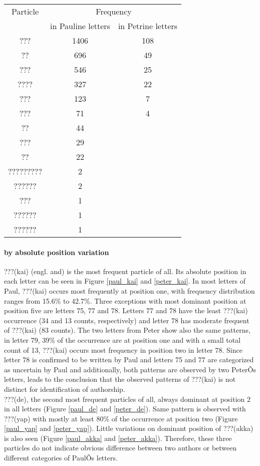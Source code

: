 \documentclass[a4paper]{article}
\begin{document}
{\renewcommand{\arraystretch}{1.3}
\begin{tabular}{ccc}
\hline
Particle &	\multicolumn{2}{c}{Frequency} \\
\cline{2-3}
&in Pauline letters  & in Petrine letters \\
\hline
??? & 1406 & 108 \\
??	& 696 & 49 \\
???	& 546 &25 \\
????	 & 327&22 \\
???	& 123 &7 \\
???  & 71 & 4 \\
??    & 44&	\\
???  & 29	& \\
??    & 22	& \\
????????? & 2	& \\
?????? &	2& \\	
???  & 1	& \\
?????? & 1 &\\
?????? & 1&	\\
\hline
\end{tabular}
}

\paragraph{by absolute position variation}
???(kai) (engl. and) is the most frequent particle of all. Its absolute position in each letter can be seen in Figure \ref{paul_kai} and \ref{peter_kai}. In most letters of Paul, ???(kai) occurs most frequently at position one, with frequency distribution ranges from 15.6\%  to 42.7\%. Three exceptions with most dominant position at position five are letters 75, 77 and 78. Letters 77 and 78 have the least ???(kai) occurrence (34 and 13 counts, respectively) and letter 78 has moderate frequent of ???(kai) (83 counts). The two letters from Peter show also the same patterns, in letter 79, 39\% of the occurrence are at position one and with a small total count of 13, ???(kai) occurs most frequency in position two in letter 78. Since letter 78 is confirmed to be written by Paul and letters 75 and 77 are categorized as uncertain by Paul and additionally, both patterns are observed by two PeterÕs letters, leads to the conclusion that the observed patterns of ???(kai) is not distinct for identification of authorship.\\

???(de), the second most frequent particles of all, always dominant at position 2 in all letters (Figure \ref{paul_de} and \ref{peter_de}). Same pattern is observed with ???(yap) with mostly at least 80\% of the occurrence at position two (Figure \ref{paul_yap} and \ref{peter_yap}). Little variations on dominant position of ???(akka) is also seen (Figure \ref{paul_akka} and \ref{peter_akka}). Therefore, these three particles do not indicate obvious difference between two authors or between different categories of PaulÕs letters. 
\end{document}
